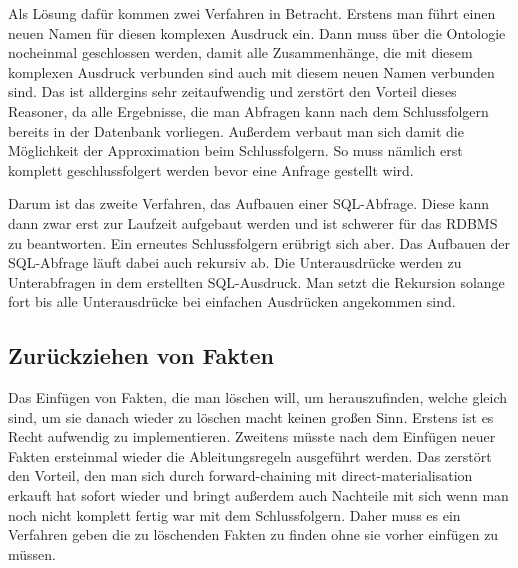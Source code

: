 Als Lösung dafür kommen zwei Verfahren in Betracht. Erstens man führt einen neuen Namen für diesen komplexen Ausdruck ein. Dann muss über die Ontologie nocheinmal geschlossen werden, damit alle Zusammenhänge, die mit diesem komplexen Ausdruck verbunden sind auch mit diesem neuen Namen verbunden sind. Das ist alldergins sehr zeitaufwendig und zerstört den Vorteil dieses Reasoner, da alle Ergebnisse, die man Abfragen kann nach dem Schlussfolgern bereits in der Datenbank vorliegen. Außerdem verbaut man sich damit die Möglichkeit der Approximation beim Schlussfolgern. So muss nämlich erst komplett geschlussfolgert werden bevor eine Anfrage gestellt wird.

Darum ist das zweite Verfahren, das Aufbauen einer SQL-Abfrage. Diese kann dann zwar erst zur Laufzeit aufgebaut werden und ist schwerer für das RDBMS zu beantworten. Ein erneutes Schlussfolgern erübrigt sich aber. Das Aufbauen der SQL-Abfrage läuft dabei auch rekursiv ab. Die Unterausdrücke werden zu Unterabfragen in dem erstellten SQL-Ausdruck. Man setzt die Rekursion solange fort bis alle Unterausdrücke bei einfachen Ausdrücken angekommen sind.

\subsection{Zurückziehen von Fakten}
Das Einfügen von Fakten, die man löschen will, um herauszufinden, welche gleich sind, um sie danach wieder zu löschen macht keinen großen Sinn. Erstens ist es Recht aufwendig zu implementieren. Zweitens müsste nach dem Einfügen neuer Fakten ersteinmal wieder die Ableitungsregeln ausgeführt werden. Das zerstört den Vorteil, den man sich durch forward-chaining mit direct-materialisation erkauft hat sofort wieder und bringt außerdem auch Nachteile mit sich wenn man noch nicht komplett fertig war mit dem Schlussfolgern.
Daher muss es ein Verfahren geben die zu löschenden Fakten zu finden ohne sie vorher einfügen zu müssen.
